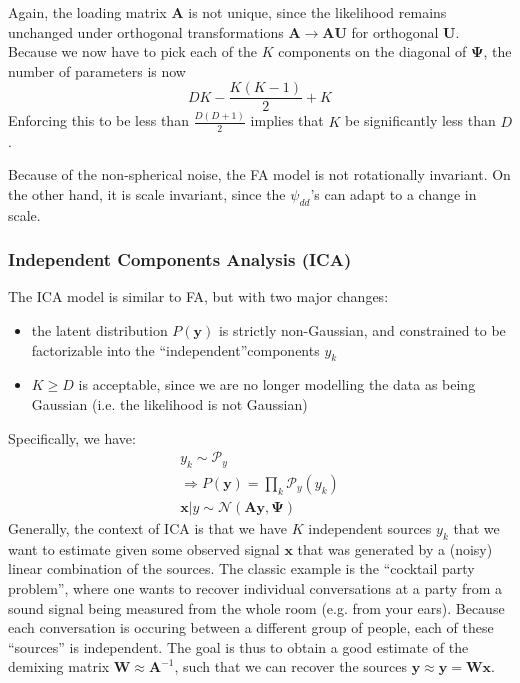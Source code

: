 \documentclass[a4paper]{article}
\begin{document}
Again, the loading matrix $\mathbf{A}$ is not unique, since the likelihood remains unchanged under orthogonal transformations $\mathbf{A}\rightarrow \mathbf{AU}$ for orthogonal $\mathbf{U}$. Because we now have to pick each of the $K$ components on the diagonal of $\mathbf{\Psi}$, the number of parameters is now
\[DK - \frac{K(K-1)}{2} + K \]
Enforcing this to be less than $\frac{D(D+1)}{2}$ implies that $K$ be significantly less than $D$. 

Because of the non-spherical noise, the FA model is not rotationally invariant. On the other hand, it is scale invariant, since the $\psi_{dd}$'s can adapt to a change in scale.

\subsubsection{Independent Components Analysis (ICA)}
The ICA model is similar to FA, but with two major changes:
\begin{itemize}
\item the latent distribution $P(\mathbf{y})$ is strictly non-Gaussian, and constrained to be factorizable into the ``independent''components $y_k$
\item $K \geq D$ is acceptable, since we are no longer modelling the data as being Gaussian (i.e. the likelihood is not Gaussian)
\end{itemize}
Specifically, we have:
\begin{gather*}
y_k \sim \mathcal{P}_y \\
\Rightarrow P(\mathbf{y}) = \prod_k \mathcal{P}_y(y_k) \\
\mathbf{x}|y \sim \mathcal{N}(\mathbf{Ay},\mathbf{\Psi})
\end{gather*}
Generally, the context of ICA is that we have $K$ independent sources $y_k$ that we want to estimate given some observed signal $\mathbf{x}$ that was generated by a (noisy) linear combination of the sources. The classic example is the ``cocktail party problem'', where one wants to recover individual conversations at a party from a sound signal being measured from the whole room (e.g. from your ears). Because each conversation is occuring between a different group of people, each of these ``sources'' is independent. The goal is thus to obtain a good estimate of the demixing matrix $\mathbf{W} \approx \mathbf{A}^{-1}$, such that we can recover the sources $\mathbf{y} \approx \hat{\mathbf{y}} = \mathbf{Wx}$.
\end{document}
